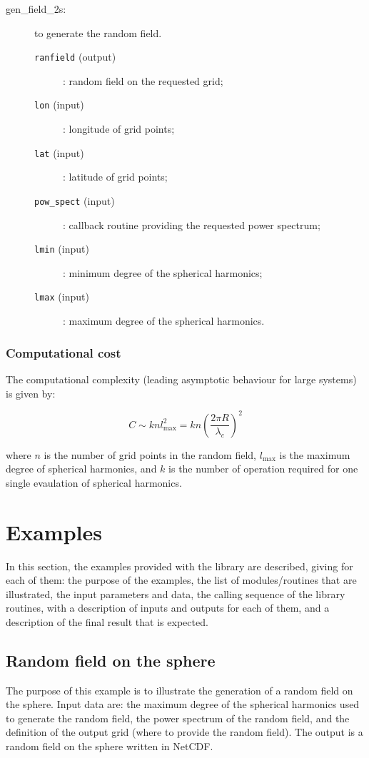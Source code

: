 \documentclass[11pt]{article}
\begin{document}
\begin{description}
\item[gen\_field\_2s:] to generate the random field.
  \begin{description}
  \item[{\tt ranfield} (output)]: random field on the requested grid;
  \item[{\tt lon} (input)]: longitude of grid points;
  \item[{\tt lat} (input)]: latitude of grid points;
  \item[{\tt pow\_spect} (input)]: callback routine providing the requested power spectrum;
  \item[{\tt lmin} (input)]: minimum degree of the spherical harmonics;
  \item[{\tt lmax} (input)]: maximum degree of the spherical harmonics.
  \end{description}
\end{description}

\subsubsection*{Computational cost}

The computational complexity (leading asymptotic behaviour for large systems)
is given by:

\begin{equation}
C \sim k n  l_{\max}^2 = k n \left( \frac{2\pi R}{\lambda_c} \right)^2
\end{equation}

\noindent
where $n$ is the number of grid points in the random field,
$l_{\max}$ is the maximum degree of spherical harmonics, and
$k$ is the number of operation required for one single evaulation
of spherical harmonics.

\section{Examples}

In this section,
the examples provided with the library are described,
giving for each of them:
the purpose of the examples,
the list of modules/routines that are illustrated,
the input parameters and data,
the calling sequence of the library routines,
with a description of inputs and outputs for each of them, and
a description of the final result that is expected.

\subsection{Random field on the sphere}

The purpose of this example is to illustrate
the generation of a random field on the sphere.
Input data are: the maximum degree of the spherical harmonics
used to generate the random field, the power spectrum of the random field,
and the definition of the output grid
(where to provide the random field).
The output is a random field on the sphere written in NetCDF.
\end{document}
